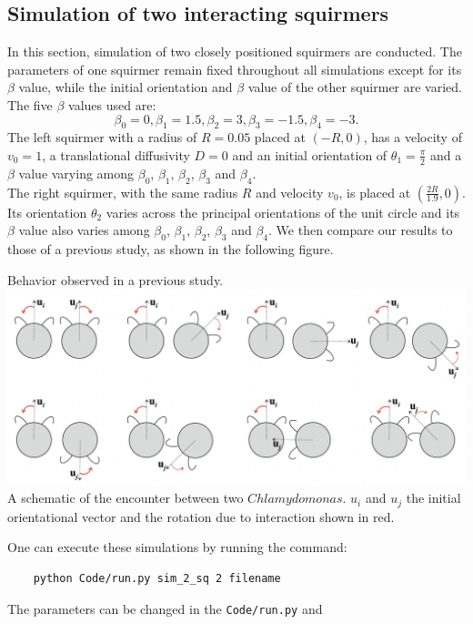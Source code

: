 \documentclass{article}
\begin{document}
\subsection{Simulation of two interacting squirmers}
In this section, simulation of two closely positioned squirmers are conducted. 
The parameters of one squirmer remain fixed throughout all simulations except for its $\beta$ value, while 
the initial orientation and $\beta$ value of the other squirmer are varied. The five $\beta$ values used are:
$$\beta_0 = 0, \beta_1 = 1.5, \beta_2 = 3, \beta_3 = -1.5, \beta_4 = -3.$$ 
The left squirmer with a radius of $R=0.05$ placed at $(-R, 0)$, has a velocity of $v_0=1$, a translational diffusivity $D=0$ and an initial orientation
of $\theta_1 = \frac{\pi}{2}$ and a $\beta$ value varying among $\beta_0$, $\beta_1$, $\beta_2$, $\beta_3$ and $\beta_4$.\\
The right squirmer, with the same radius $R$ and velocity $v_0$, is placed at $(\frac{2R}{1.9}, 0)$. Its orientation $\theta_2$
varies across the principal orientations of the unit circle and its $\beta$ value also varies among $\beta_0$, $\beta_1$, $\beta_2$, $\beta_3$ and $\beta_4$.
We then compare our results to those of a previous study, as shown in the following figure\cite{Stark}.
\begin{center}
    Behavior observed in a previous study.
    \includegraphics[width=1\textwidth]{Presentation/images/stark_behavior.png}\\
    A schematic of the encounter between two $Chlamydomonas$. 
    $u_i$ and $u_j$ the initial orientational vector and the rotation due to interaction shown in red.  
 \end{center}
 One can execute these simulations by running the command:
 \begin{verbatim}
    python Code/run.py sim_2_sq 2 filename
 \end{verbatim}
 The parameters can be changed in the \texttt{Code/run.py} and \\
\end{document}
